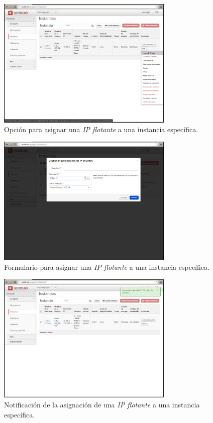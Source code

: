 \documentclass{article}
\begin{document}
\begin{figure}[h]
  \centering
    \includegraphics[width=0.75\textwidth]{img/m_051.png}
  \caption{Opción para asignar una \emph{IP flotante} a una instancia específica.}
  \label{fig:InstanceIPFloatingOption}
\end{figure}	

\begin{figure}[h]
  \centering
    \includegraphics[width=0.75\textwidth]{img/m_052.png}
  \caption{Formulario para asignar una \emph{IP flotante} a una instancia específica.}
  \label{fig:InstanceIPFloatingMatchForm}
\end{figure}

\begin{figure}[h]
  \centering
    \includegraphics[width=0.75\textwidth]{img/m_053.png}
  \caption{Notificación de la asignación de una \emph{IP flotante} a una instancia específica.}
  \label{fig:InstanceIPFloatingMatch}
\end{figure}	
\end{document}

